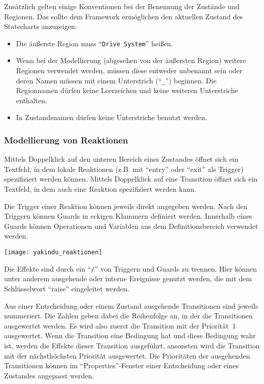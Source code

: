 Zusätzlich gelten einige Konventionen bei der Benennung der Zustände und Regionen. 
Das sollte dem Framework ermöglichen den aktuellen Zustand des Statecharts anzuzeigen:
\begin{itemize}
	\setlength\topsep{-1em}
	\setlength\itemsep{-0.5em}
	\item Die äußerste Region muss \enquote{\texttt{Drive System}} heißen.
	\item Wenn bei der Modellierung (abgesehen von der äußersten Region) weitere Regionen verwendet werden, müssen diese entweder unbenannt sein oder deren Namen müssen mit einem Unterstrich (\enquote{\texttt{\_}}) beginnen. 
	Die Regionnamen dürfen keine Leerzeichen und keine weiteren Unterstriche enthalten.
	\item In Zustandsnamen dürfen keine Unterstriche benutzt werden.
\end{itemize}



\subsubsection{Modellierung von Reaktionen}

Mittels Doppelklick auf den unteren Bereich eines Zustandes öffnet sich ein Textfeld, in dem lokale Reaktionen (z.B. mit \enquote{entry} oder \enquote{exit} als Trigger) spezifiziert werden können.
Mittels Doppelklick auf eine Transition öffnet sich ein Textfeld, in dem auch eine Reaktion spezifiziert werden kann. 

Die Trigger einer Reaktion können jeweils direkt angegeben werden.
Nach den Triggern können Guards in eckigen Klammern definiert werden.
Innerhalb eines Guards können Operationen und Variablen aus dem Definitionsbereich verwendet werden. 

\begin{center}
	\texttt{[image: yakindu\_reaktionen]}	
\end{center}

Die Effekte sind durch ein \enquote{\texttt{/}} von Triggern und Guards zu trennen. 
Hier können unter anderem ausgehende oder interne Ereignisse genutzt werden, die mit dem Schlüsselwort \enquote{raise} eingeleitet werden.
 
Aus einer Entscheidung oder einem Zustand ausgehende Transitionen sind jeweils nummeriert. 
Die Zahlen geben dabei die Reihenfolge an, in der die Transitionen ausgewertet werden.
Es wird also zuerst die Transition mit der Priorität~1 ausgewertet. 
Wenn die Transition eine Bedingung hat und diese Bedingung wahr ist, werden die Effekte dieser Transition ausgeführt, ansonsten wird die Transition mit der nächsthöchsten Priorität ausgewertet.
Die Prioritäten der ausgehenden Transitionen können im \enquote{Properties}-Fenster einer Entscheidung oder eines Zustandes angepasst werden.


